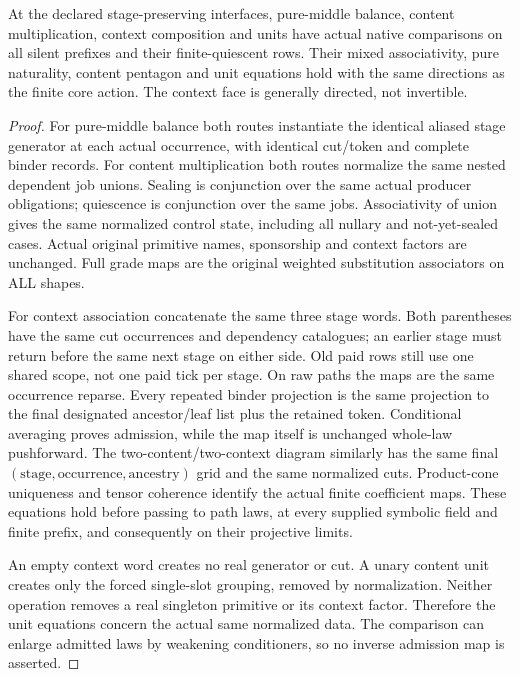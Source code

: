 \documentclass[11pt]{article}
\begin{document}
\begin{theorem}
At the declared stage-preserving interfaces, pure-middle balance, content multiplication, context composition and units have actual native comparisons on all silent prefixes and their finite-quiescent rows. Their mixed associativity, pure naturality, content pentagon and unit equations hold with the same directions as the finite core action. The context face is generally directed, not invertible.
\end{theorem}
\begin{proof}
For pure-middle balance both routes instantiate the identical aliased stage generator at each actual occurrence, with identical cut/token and complete binder records. For content multiplication both routes normalize the same nested dependent job unions. Sealing is conjunction over the same actual producer obligations; quiescence is conjunction over the same jobs. Associativity of union gives the same normalized control state, including all nullary and not-yet-sealed cases. Actual original primitive names, sponsorship and context factors are unchanged. Full grade maps are the original weighted substitution associators on ALL shapes.

For context association concatenate the same three stage words. Both parentheses have the same cut occurrences and dependency catalogues; an earlier stage must return before the same next stage on either side. Old paid rows still use one shared scope, not one paid tick per stage. On raw paths the maps are the same occurrence reparse. Every repeated binder projection is the same projection to the final designated ancestor/leaf list plus the retained token. Conditional averaging proves admission, while the map itself is unchanged whole-law pushforward. The two-content/two-context diagram similarly has the same final $(\mathrm{stage},\mathrm{occurrence},\mathrm{ancestry})$ grid and the same normalized cuts. Product-cone uniqueness and tensor coherence identify the actual finite coefficient maps. These equations hold before passing to path laws, at every supplied symbolic field and finite prefix, and consequently on their projective limits.

An empty context word creates no real generator or cut. A unary content unit creates only the forced single-slot grouping, removed by normalization. Neither operation removes a real singleton primitive or its context factor. Therefore the unit equations concern the actual same normalized data. The comparison can enlarge admitted laws by weakening conditioners, so no inverse admission map is asserted.\end{proof}
\end{document}
